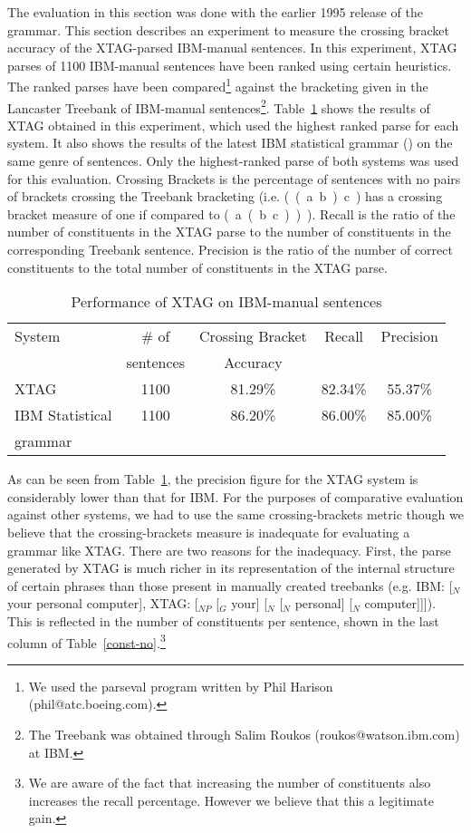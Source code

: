 The evaluation in this section was done with the earlier 1995 release
of the grammar. This section describes an experiment to measure the
crossing bracket accuracy of the XTAG-parsed IBM-manual sentences.  In
this experiment, XTAG parses of 1100 IBM-manual sentences have been
ranked using certain heuristics. The ranked parses have been
compared\footnote{We used the parseval program written by Phil Harison
  (phil@atc.boeing.com).}  against the bracketing given in the
Lancaster Treebank of IBM-manual sentences\footnote{The Treebank was
  obtained through Salim Roukos (roukos@watson.ibm.com) at IBM.}.
Table~\ref{ibm-results} shows the results of XTAG obtained in this
experiment, which used the highest ranked parse for each system. It
also shows the results of the latest IBM statistical grammar
(\cite{jelineketal94}) on the same genre of sentences. Only the
highest-ranked parse of both systems was used for this evaluation.
Crossing Brackets is the percentage of sentences with no pairs of
brackets crossing the Treebank bracketing (i.e.  (~(~a~b~)~c~) has a
crossing bracket measure of one if compared to (~a~(~b~c~)~)~). Recall
is the ratio of the number of constituents in the XTAG parse to the
number of constituents in the corresponding Treebank sentence.
Precision is the ratio of the number of correct constituents to the
total number of constituents in the XTAG parse.

\begin{table}[ht]
\centering
\begin{tabular}{|l|c|c|c|c|} \hline 
System & \# of & Crossing Bracket & Recall & Precision \\
& sentences & Accuracy & & \\ \hline
XTAG & 1100 & 81.29\% & 82.34\% & 55.37\% \\ \hline
IBM Statistical & 1100 & 86.20\% & 86.00\% & 85.00\% \\
grammar & &  &  &\\ \hline
\end{tabular}

\vspace{0.1in}

\caption{Performance of XTAG on IBM-manual sentences}
\label{ibm-results} 

\end{table}

As can be seen from Table~\ref{ibm-results}, the precision figure for
the XTAG system is considerably lower than that for IBM. For the
purposes of comparative evaluation against other systems, we had to
use the same crossing-brackets metric though we believe that the
crossing-brackets measure is inadequate for evaluating a grammar like
XTAG. There are two reasons for the inadequacy. First, the parse
generated by XTAG is much richer in its representation of the internal
structure of certain phrases than those present in manually created
treebanks (e.g. IBM: [$_N$ your personal computer], XTAG: [$_{NP}$
[$_G$ your] [$_N$ [$_N$ personal] [$_N$ computer]]]). This is
reflected in the number of constituents per sentence, shown in the
last column of Table~\ref{const-no}.\footnote{We are aware of the fact
  that increasing the number of constituents also increases the recall
  percentage. However we believe that this a legitimate gain.}

